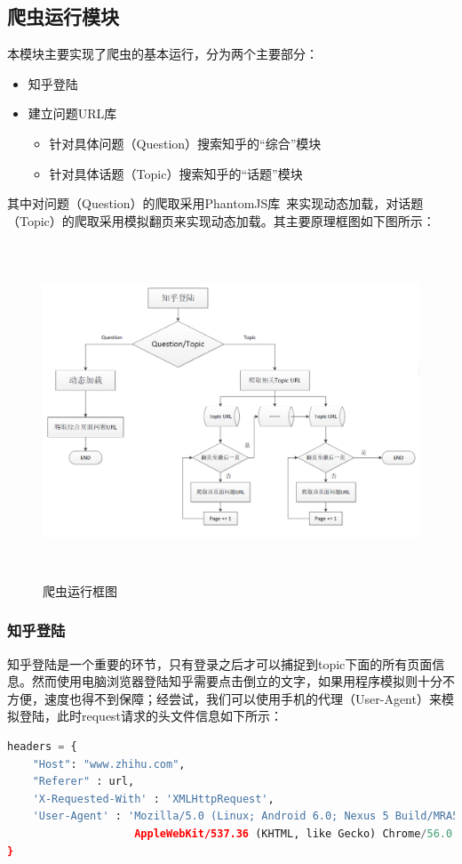 \documentclass[UTF-8,a4paper, 12pt]{article}
\numberwithin{equation}{section}
\begin{document}
\subsection{爬虫运行模块}
本模块主要实现了爬虫的基本运行，分为两个主要部分：
\vspace{-0.5cm}
\begin{itemize}
  \item 知乎登陆
  \item 建立问题URL库
  \begin{itemize}
    \item 针对具体问题（Question）搜索知乎的“综合”模块
    \item 针对具体话题（Topic）搜索知乎的“话题”模块
  \end{itemize}
\end{itemize}
\vspace{-0.3cm}
其中对问题（Question）的爬取采用PhantomJS库~\cite{bibtex2}来实现动态加载，对话题（Topic）的爬取采用模拟翻页来实现动态加载。其主要原理框图如下图所示：
\begin{figure}[!htbp]
  \centering
  \includegraphics[width=15cm,height=10cm]{爬虫运行框图.png}
  \caption{爬虫运行框图}
\end{figure}
\subsubsection{知乎登陆}
知乎登陆是一个重要的环节，只有登录之后才可以捕捉到topic下面的所有页面信息。然而使用电脑浏览器登陆知乎需要点击倒立的文字，如果用程序模拟则十分不方便，速度也得不到保障；经尝试，我们可以使用手机的代理（User-Agent）来模拟登陆，此时request请求的头文件信息如下所示：
\begin{lstlisting}[language=python]
headers = {
    "Host": "www.zhihu.com",
    "Referer" : url,
    'X-Requested-With' : 'XMLHttpRequest',
    'User-Agent' : 'Mozilla/5.0 (Linux; Android 6.0; Nexus 5 Build/MRA58N)
                    AppleWebKit/537.36 (KHTML, like Gecko) Chrome/56.0.2924.87 Mobile Safari/537.36'
}
\end{lstlisting}
\end{document}
